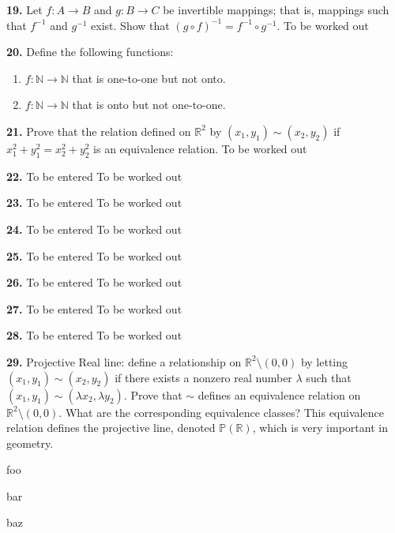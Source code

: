 \documentclass[12pt]{amsart}
\newenvironment{statement}[1]{\smallskip\noindent\color[rgb]{1.00,0.00,0.50} {\bf #1.}}{}
\theoremstyle{definition}
\theoremstyle{remark}
\newcommand{\BR}{\mathbb R}
\newcommand{\BN}{\mathbb N}
\begin{document}
\begin{statement}{19}
Let $f : A \to B$ and $g : B \to C$ be invertible mappings; that is,
mappings such that $f^{-1}$ and $g^{-1}$ exist. Show that $(g \circ
f)^{-1} = f^{-1} \circ g^{-1}$.
\end{statement}
To be worked out 


\begin{statement}{20}
Define the following functions:
\end{statement}

\begin{enumerate}[label=(\alph*)]
\item $f : \BN \to \BN$ that is one-to-one but not onto.
\item $f : \BN \to \BN$ that is onto but not one-to-one.
\end{enumerate}

\begin{statement}{21}
Prove that the relation defined on $\BR^2$ by $(x_1,y_1) \sim (x_2,y_2)$ if $x_1^2 + y_1^2 = x_2^2 + y_2^2$ is an equivalence relation.
\end{statement}
To be worked out


\begin{statement}{22}
To be entered
\end{statement}
To be worked out


\begin{statement}{23}
To be entered
\end{statement}
To be worked out


\begin{statement}{24}
To be entered
\end{statement}
To be worked out


\begin{statement}{25}
To be entered
\end{statement}
To be worked out


\begin{statement}{26}
To be entered
\end{statement}
To be worked out


\begin{statement}{27}
To be entered
\end{statement}
To be worked out


\begin{statement}{28}
To be entered
\end{statement}
To be worked out


\begin{statement}{29}
Projective Real line: define a relationship on $\BR^2 \setminus (0,0)$
by letting $(x_1,y_1) \sim (x_2,y_2)$ if there exists a nonzero real
number $\lambda$ such that $(x_1,y_1) \sim (\lambda x_2,\lambda
y_2)$. Prove that $\sim$ defines an equivalence relation on
$\BR^2 \setminus (0,0)$. What are the corresponding equivalence
classes? This equivalence relation defines the projective line,
denoted $\mathbb{P}(\BR)$, which is very important in geometry.

\end{statement}

foo

bar

baz
\end{document}

